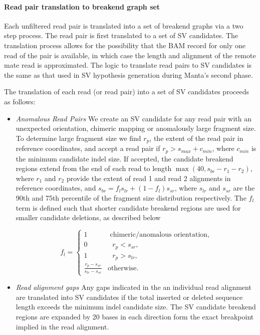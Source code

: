 \documentclass{article}
\begin{document}
\paragraph{Read pair translation to breakend graph set}
Each unfiltered read pair is translated into a set of breakend graphs via a two step process. The read pair is first translated to a set of SV candidates. The translation process allows for the possibility that the BAM record for only one read of the pair is available, in which case the length and alignment of the remote mate read is approximated. The logic to translate read pairs to SV candidates is the same as that used in SV hypothesis generation during Manta's second phase.

The translation of each read (or read pair) into a set of SV candidates proceeds as follows:
\begin{itemize}
\item \textit{Anomalous Read Pairs} We create an SV candidate for any read pair with an unexpected orientation, chimeric mapping or anomalously large fragment size. To determine large fragment size we find $r_p$, the extent of the read pair in reference coordinates, and accept a read pair if $r_p > s_{max} + c_{min}$, where $c_{min}$ is the minimum candidate indel size. If accepted, the candidate breakend regions extend from the end of each read to length $\max(40, s_{br} - r_1 - r_2)$, where $r_1$ and $r_2$ provide the extent of read 1 and read 2 alignments in reference coordinates, and $s_{br}  = f_l s_{lr} + (1 - f_l) s_{sr}$, where $s_{lr}$ and $s_{sr}$ are the 90th and 75th percentile of the fragment size distribution respectively. The $f_l$ term is defined such that shorter candidate breakend regions are used for smaller candidate deletions, as described below

\begin{equation*}
f_l = 
\left\{
\begin{array}{cl}
1 & \mbox{ chimeric/anomalous orientation,} \\
0 & \mbox{ $r_p < s_{sr}$, } \\
1 & \mbox{ $r_p > s_{lr}$, } \\
\frac{r_p - s_{sr}} {s_{lr} - s_{sr}} & \mbox{otherwise.}
\end{array}
\right.
\end{equation*} 

\item \textit{Read alignment gaps} Any gaps indicated in the an individual read alignment are translated into SV candidates if the total inserted or deleted sequence length exceeds the minimum indel candidate size. The SV candidate breakend regions are expanded by 20 bases in each direction form the exact breakpoint implied in the read alignment.


\end{itemize}
\end{document}
